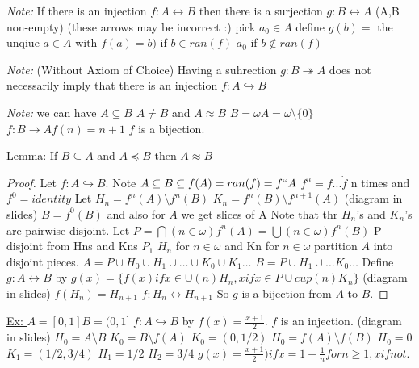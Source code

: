 
%
%
%



\emph{Note: } If there is an injection $f : A \leftrightarrow B$ then there is a surjection $g : B \leftrightarrow A$ (A,B non-empty) (these arrows may be incorrect :)
pick $a_0 \in A$
define $g(b) = $ the unqiue $a \in A$ with $f(a) = b)$ if $b \in ran(f)$ $a_0$ if $b \notin ran(f)$

\emph{Note: } (Without Axiom of Choice) Having a suhrection $g : B \twoheadrightarrow A$ does not necessarily imply that there is an injection $f : A \hookrightarrow B$

\emph{Note: } we can have $A \subseteq B$ $A \neq B$ and $A \approx B$
$B = \omega A = \omega \setminus \{0\}$
$f : B \rightarrow A f(n) = n+1$
$f$ is a bijection.

\underline{Lemma: } If $B \subseteq A$ and $A \preceq B$ then $A \approx B$

\begin{proof}
    Let $f : A \hookrightarrow B$.
    Note $A \subseteq B \subseteq f(A) = ran(f) = f``A$
    $f^n = f \dot ... \dot f$ n times and $f^0 = identity$
    Let $H_n = f^n(A) \setminus f^n(B)$
    $K_n = f^n(B) \setminus f^{n+1}(A)$
    (diagram in slides)
    $B = f^0(B)$ and also for $A$
    we get slices of A
    Note that thr $H_n$'s and $K_n$'s are pairwise disjoint.
    Let $P = \bigcap (n \in \omega) f^n(A) = \bigcup (n \in \omega) f^n(B)$
    P disjoint from Hns and Kns
    $P_1$ $H_n$ for $n \in \omega$ and Kn for $n \in \omega$
    partition $A$ into disjoint pieces.
    $A = P \cup H_0 \cup H_1 \cup \dots \cup K_0 \cup K_1 \dots$
    $B = P \cup H_1 \cup \dots K_0 \dots$
    Define $g : A \leftrightarrow B$ by
    $g(x) = \{f(x) if x \in \cup (n) H_n , x if x \in P \cup cup (n) K_n\}$
    (diagram in slides)
    $f(H_n) = H_{n+1}$
    $f : H_n \leftrightarrow H_{n+1}$
    So $g$ is a bijection from $A$ to $B$.
\end{proof}

\underline{Ex: } $A = [0,1] B = (0,1]$
$f : A \hookrightarrow B$ by $f(x) = \frac{x+1}{2}$.
$f$ is an injection.
(diagram in slides)
$H_0 = A \setminus B$
$K_0 = B \setminus f(A)$
$K_0 = (0,1/2)$
$H_0 = f(A) \setminus f(B)$
$H_0 = 0$
$K_1 = (1/2,3/4)$
$H_1 = 1/2$
$H_2 = 3/4$
$g(x) = \frac{x+1}{2}) if x = 1-\frac{1}{n} for n \geq 1, x if not$.


